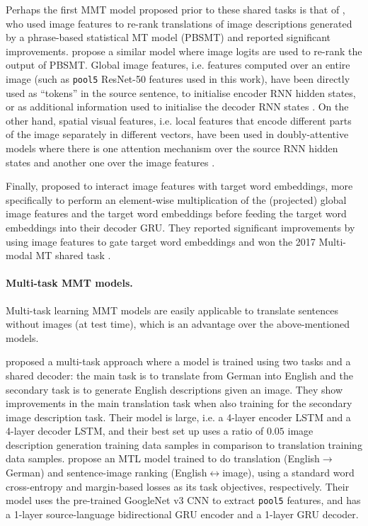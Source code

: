 \documentclass[11pt,a4paper]{article}
\begin{document}
Perhaps the first MMT model proposed prior to these shared tasks is that of , who used image features to re-rank translations of image descriptions generated by a phrase-based statistical MT model (PBSMT) and reported significant improvements.
\citet{Shahetal2016} propose a similar model where image logits are used to re-rank the output of PBSMT.
Global image features, i.e. features computed over an entire image (such as \texttt{pool5} ResNet-50 features used in this work), have been directly used as ``tokens'' in the source sentence, to initialise encoder RNN hidden states, or as additional information used to initialise the decoder RNN states \citep{Huangetal2016,Libovickyetal2016,CalixtoLiu2017}.
On the other hand, spatial visual features, i.e. local features that encode different parts of the image separately in different vectors, have been used in doubly-attentive models where there is one attention mechanism over the source RNN hidden states and another one over the image features \citep{Caglayanetal2016,Calixtoetal2017}.

Finally, \citet{Caglayanetal2017} proposed to interact image features with target word embeddings, more specifically to perform an element-wise multiplication of the (projected) global image features and the target word embeddings before feeding the target word embeddings into their decoder GRU.
They reported significant improvements by using image features to gate target word embeddings and won the 2017 Multi-modal MT shared task \citep{Elliottetal2017}.


\paragraph{Multi-task MMT models.} Multi-task learning MMT models are easily applicable to translate sentences without images (at test time), which is an advantage over the above-mentioned models.

 proposed a multi-task approach where a model is trained using two tasks and a shared decoder: the main task is to translate from German into English and the secondary task is to generate English descriptions given an image.
They show improvements in the main translation task when also training for the secondary image description task.
Their model is large, i.e. a 4-layer encoder LSTM and a 4-layer decoder LSTM, and their best set up uses a ratio of $0.05$ image description generation training data samples in comparison to translation training data samples.
\citet{ElliottKadar2017} propose an MTL model trained to do translation (English$\rightarrow$German) and sentence-image ranking (English$\leftrightarrow$image), using a standard word cross-entropy and margin-based losses as its task objectives, respectively.
Their model uses the pre-trained GoogleNet v3 CNN \citep{Szegedyetal2016} to extract \texttt{pool5} features, and has a 1-layer source-language bidirectional GRU encoder and a 1-layer GRU decoder.
\end{document}
